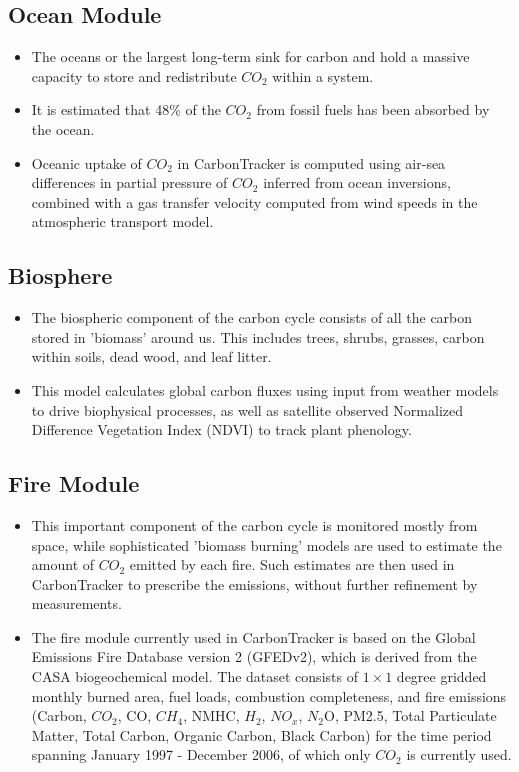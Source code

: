 \documentclass[12pt,letterpaper]{report}
\begin{document}
	\subsection*{Ocean Module}
	 \begin{itemize}
	 \item The oceans or the largest long-term sink for carbon and hold a massive capacity to store and redistribute $CO_2$ within a system.
	 \item It is estimated that 48\% of the $CO_2$ from fossil fuels has been absorbed by the ocean.
	 \item Oceanic uptake of $CO_2$ in CarbonTracker is computed using air-sea differences in partial pressure of $CO_2$ inferred from ocean inversions, combined with a gas transfer velocity computed from wind speeds in the atmospheric transport model.
	 \end{itemize}
	\subsection*{Biosphere}
	 \begin{itemize}
	 \item The biospheric component of the carbon cycle consists of all the carbon stored in 'biomass' around us. This includes trees, shrubs, grasses, carbon within soils, dead wood, and leaf litter.
	 \item This model calculates global carbon fluxes using input from weather models to drive biophysical processes, as well as satellite observed Normalized Difference Vegetation Index (NDVI) to track plant phenology.
	 \end{itemize}
	\subsection*{Fire Module}
	 \begin{itemize}
	 \item This important component of the carbon cycle is monitored mostly from space, while sophisticated 'biomass burning' models are used to estimate the amount of $CO_2$ emitted by each fire. Such estimates are then used in CarbonTracker to prescribe the emissions, without further refinement by measurements.
	 \item The fire module currently used in CarbonTracker is based on the Global Emissions Fire Database version 2 (GFEDv2), which is derived from the CASA biogeochemical model.  The dataset consists of $1\times1$ degree gridded monthly burned area, fuel loads, combustion completeness, and fire emissions (Carbon, $CO_2$, CO, $CH_4$, NMHC, $H_2$, $NO_x$, $N_2$O, PM2.5, Total Particulate Matter, Total Carbon, Organic Carbon, Black Carbon) for the time period spanning January 1997 - December 2006, of which only $CO_2$ is currently used.
	 \end{itemize}
\end{document}
